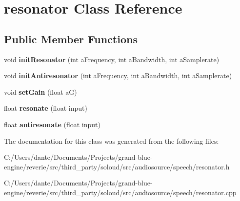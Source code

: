 \hypertarget{classresonator}{}\section{resonator Class Reference}
\label{classresonator}
\subsection*{Public Member Functions}
\begin{DoxyCompactItemize}
\item 
\mbox{\label{classresonator_a2d2781b777e7a5c5cfc20c6c35288d7d}} 
void {\bfseries init\+Resonator} (int a\+Frequency, int a\+Bandwidth, int a\+Samplerate)
\item 
\mbox{\label{classresonator_a99f95c96ab5713f738cb922a9809646e}} 
void {\bfseries init\+Antiresonator} (int a\+Frequency, int a\+Bandwidth, int a\+Samplerate)
\item 
\mbox{\label{classresonator_a83fe142299818166400d3a19e9417277}} 
void {\bfseries set\+Gain} (float aG)
\item 
\mbox{\label{classresonator_a604d3e9e65bfe254657e7925a011ac9d}} 
float {\bfseries resonate} (float input)
\item 
\mbox{\label{classresonator_a80ca7541e9eaf1618065ea3ce075f115}} 
float {\bfseries antiresonate} (float input)
\end{DoxyCompactItemize}


The documentation for this class was generated from the following files\+:\begin{DoxyCompactItemize}
\item 
C\+:/\+Users/dante/\+Documents/\+Projects/grand-\/blue-\/engine/reverie/src/third\+\_\+party/soloud/src/audiosource/speech/resonator.\+h\item 
C\+:/\+Users/dante/\+Documents/\+Projects/grand-\/blue-\/engine/reverie/src/third\+\_\+party/soloud/src/audiosource/speech/resonator.\+cpp\end{DoxyCompactItemize}
